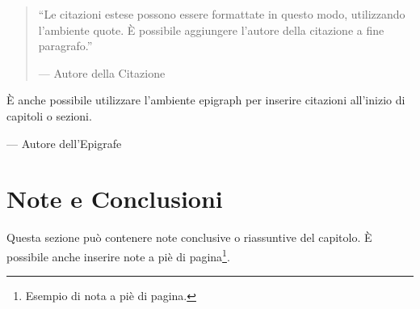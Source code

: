 \begin{quote}
    ``Le citazioni estese possono essere formattate in questo modo, utilizzando l'ambiente quote. È possibile aggiungere l'autore della citazione a fine paragrafo.''
    \begin{flushright}
        --- Autore della Citazione
    \end{flushright}
\end{quote}

\epigraph{È anche possibile utilizzare l'ambiente epigraph per inserire citazioni all'inizio di capitoli o sezioni.}{--- Autore dell'Epigrafe}

\section{Note e Conclusioni}
Questa sezione può contenere note conclusive o riassuntive del capitolo. È possibile anche inserire note a piè di pagina\footnote{Esempio di nota a piè di pagina.}.